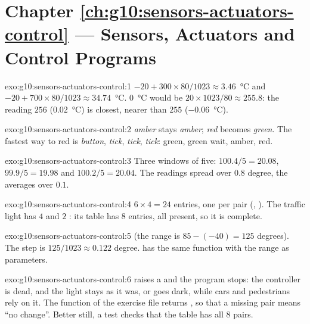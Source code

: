 \section*{Chapter \ref{ch:g10:sensors-actuators-control} --- Sensors, Actuators and Control Programs}

\begin{solution}{exo:g10:sensors-actuators-control:1}
$-20 + 300 \times 80/1023 \approx 3.46$~°C and $-20 + 700 \times 80/1023 \approx 34.74$~°C. $0$~°C would be
$20 \times 1023/80 \approx 255.8$: the reading $256$ ($0.02$~°C) is closest, nearer than $255$ ($-0.06$~°C).
\end{solution}

\begin{solution}{exo:g10:sensors-actuators-control:2}
\textit{amber} stays \textit{amber}; \textit{red} becomes \textit{green}. The fastest way to red is \textit{button},
\textit{tick}, \textit{tick}, \textit{tick}: green, green wait, amber, red.
\end{solution}

\begin{solution}{exo:g10:sensors-actuators-control:3}
Three windows of five: $100.4/5 = 20.08$, $99.9/5 = 19.98$ and $100.2/5 = 20.04$. The readings spread over
$0.8$ degree, the averages over $0.1$.
\end{solution}

\begin{solution}{exo:g10:sensors-actuators-control:4}
$6 \times 4 = 24$ entries, one per pair (, ). The traffic light has $4$  and $2$ : its table has
$8$ entries, all present, so it is complete.
\end{solution}

\begin{solution}{exo:g10:sensors-actuators-control:5}
 (the range is $85 - (-40) = 125$ degrees). The step is $125/1023 \approx 0.122$
degree.  has the same function with the range as parameters.
\end{solution}

\begin{solution}{exo:g10:sensors-actuators-control:6}
 raises a  and the program stops: the controller is dead, and the
light stays as it was, or goes dark, while cars and pedestrians rely on it. The function  of the
exercise file returns , so that a missing pair means ``no change''. Better still, a test checks that the table has all $8$ pairs.
\end{solution}


